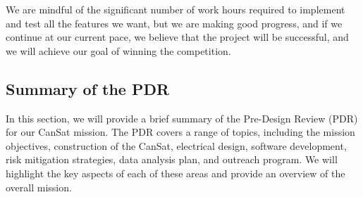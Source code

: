 \documentclass[11pt]{article}
\begin{document}
We are mindful of the significant number of work hours required to implement and test all the features we want, but we are making good progress, and if we continue at our current pace, we believe that the project will be successful, and we will achieve our goal of winning the competition.

\subsection{Summary of the PDR}
In this section, we will provide a brief summary of the Pre-Design Review (PDR) for our CanSat mission. The PDR covers a range of topics, including the mission objectives, construction of the CanSat, electrical design, software development, risk mitigation strategies, data analysis plan, and outreach program. We will highlight the key aspects of each of these areas and provide an overview of the overall mission.
\end{document}
